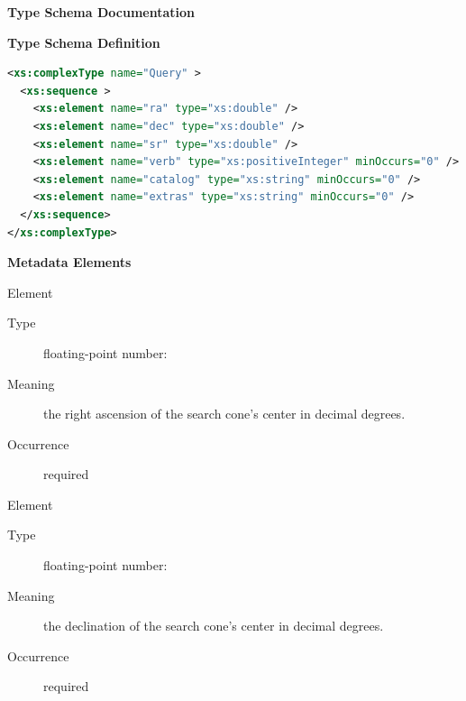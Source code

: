 \documentclass[11pt,a4paper]{ivoa}
\begin{document}
\begin{generated}
\begingroup
      	\renewcommand*\descriptionlabel[1]{%
      	\hbox to 5.5em{\emph{#1}\hfil}}\vspace{2ex}\noindent\textbf{ Type Schema Documentation}


\vspace{1ex}\noindent\textbf{ Type Schema Definition}

\begin{lstlisting}[language=XML,basicstyle=\footnotesize]
<xs:complexType name="Query" >
  <xs:sequence >
    <xs:element name="ra" type="xs:double" />
    <xs:element name="dec" type="xs:double" />
    <xs:element name="sr" type="xs:double" />
    <xs:element name="verb" type="xs:positiveInteger" minOccurs="0" />
    <xs:element name="catalog" type="xs:string" minOccurs="0" />
    <xs:element name="extras" type="xs:string" minOccurs="0" />
  </xs:sequence>
</xs:complexType>
\end{lstlisting}

\vspace{0.5ex}\noindent\textbf{ Metadata Elements}

\begingroup\small\begin{bigdescription}\item[Element \xmlel{ra}]
\begin{description}
\item[Type] floating-point number: 
\item[Meaning] 
                   the right ascension of the search cone's center in
                   decimal degrees.  
               
\item[Occurrence] required

\end{description}
\item[Element \xmlel{dec}]
\begin{description}
\item[Type] floating-point number: 
\item[Meaning] 
                   the declination of the search cone's center in
                   decimal degrees.  
               
\item[Occurrence] required


\end{description}
\end{bigdescription}
\end{generated}
\end{document}
